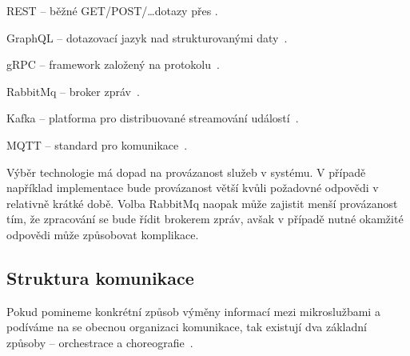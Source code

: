 \begin{dl}
   \item [REST] – běžné GET/POST/\ldots dotazy přes .
   \item [GraphQL] – dotazovací jazyk nad strukturovanými daty~\cite{graphql}.
   \item [gRPC] – framework založený na  protokolu~\cite{grpc}.
   \item [RabbitMq] – broker zpráv~\cite{rabbitmq}.
   \item [Kafka] – platforma pro distribuované streamování událostí~\cite{kafka}.
   \item [MQTT] – standard pro  komunikace~\cite{mqtt}.
\end{dl}

Výběr technologie má dopad na provázanost služeb v systému.
V případě například  implementace bude provázanost větší kvůli požadovné odpovědi v relativně krátké době.
Volba RabbitMq naopak může zajistit menší provázanost tím, že zpracování se bude řídit brokerem zpráv, avšak v případě nutné okamžité odpovědi může způsobovat komplikace.



\subsection{Struktura komunikace}\label{subsec:msa-communication-structure}

Pokud pomineme konkrétní způsob výměny informací mezi mikroslužbami a podíváme na se obecnou organizaci komunikace, tak existují dva základní způsoby – orchestrace a choreografie~\cite{choreovsorch}.


